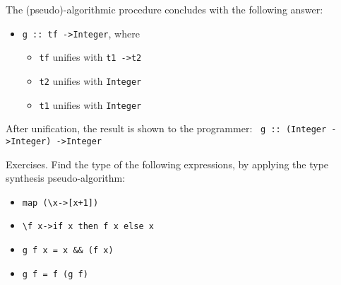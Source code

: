 The (pseudo)-algorithmic procedure concludes with the following answer:
\begin{itemize}
	\item  \texttt{g :: tf -\textgreater  Integer}, where

  \begin{itemize}
  	\item  \texttt{tf} unifies with \texttt{t1 -\textgreater  t2}
  	\item  \texttt{t2} unifies with \texttt{Integer}
  	\item  \texttt{t1} unifies with \texttt{Integer}
  \end{itemize}
\end{itemize}

After unification, the result is shown to the programmer: \texttt{ g :: (Integer -\textgreater  Integer) -\textgreater  Integer}

Exercises. Find the type of the following expressions, by applying the type synthesis pseudo-algorithm:
\begin{itemize}
	\item  \texttt{map (\textbackslash x-\textgreater [x+1])}
	\item  \texttt{\textbackslash f x-\textgreater  if x then f x else x}
	\item  \texttt{g f x = x \&\& (f x)}
	\item  \texttt{g f = f (g f)}
\end{itemize}

